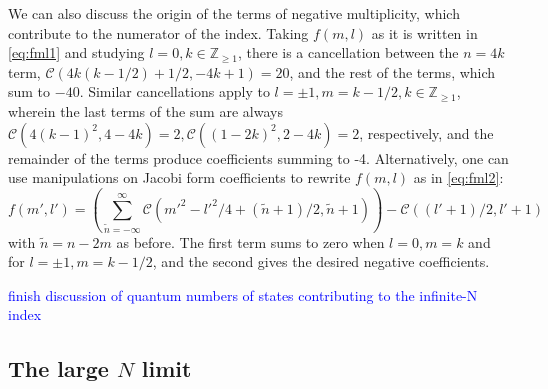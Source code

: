 \documentclass[../main.tex]{subfiles}
\begin{document}
We can also discuss the origin of the terms of negative multiplicity, which contribute to the numerator of the index. Taking $f(m,l)$ as it is written in \eqref{eq:fml1} and studying $l=0, k \in \mathbb{Z}_{\geq 1}$, there is a cancellation between the $n=4k$ term, $\mathcal{C}(4k(k-1/2) + 1/2,-4k+1)=20$, and the rest of the terms, which sum to $-40$. Similar cancellations apply to $l=\pm 1, m = k-1/2, k \in \mathbb{Z}_{\geq 1}$, wherein the last terms of the sum are always $\mathcal{C}(4(k-1)^2, 4-4k) = 2, \mathcal{C}((1-2k)^2, 2-4k) = 2$, respectively, and the remainder of the terms produce coefficients summing to -4. Alternatively, one can use manipulations on Jacobi form coefficients to rewrite $f(m, l)$ as in \eqref{eq:fml2}:
\begin{equation}
f(m', l') =\left(\sum_{\tilde{n}= - \infty}^{\infty}\mathcal{C}(m'^2 - l'^2/4 + (\tilde{n} + 1)/2, \tilde{n} + 1) \right) - \mathcal{C}((l' + 1)/2, l' + 1)
\end{equation} with $\tilde{n} = n-2m$ as before. The first term sums to zero when $l=0, m= k$ and for $l=\pm 1, m = k-1/2$, and the second gives the desired negative coefficients.


\textcolor{blue}{finish discussion of quantum numbers of states contributing to the infinite-N index}

\subsection{The large $N$ limit}

\end{document}
